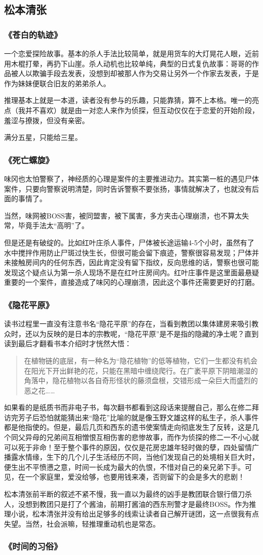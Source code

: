 \subsection{松本清张}
\subsubsection{《苍白的轨迹》}
一个恋爱探险故事。基本的杀人手法比较简单，就是用货车的大灯晃花人眼，近前用木棍打晕，再扔下山崖。杀人动机也比较单纯，典型的日式复仇故事：哥哥的作品被人以欺骗手段去发表，没想到却被那人作为交易让另外一个作家去发表，于是作为妹妹便联合旧友的弟弟杀人。
 
推理基本上就是一本道，读者没有参与的乐趣，只能靠猜，算不上本格。唯一的亮点（我并不喜欢）就是由一对恋人来作为侦探，但互动仅仅在于恋爱的开始阶段，羞涩与撩拨，但没有亲密。
 
满分五星，只能给三星。

\subsubsection{《死亡螺旋》}
味冈也太怕警察了，神经质的心理是案件的主要推进动力。其实第一桩的遇见尸体案件，只要向警察说明清楚，同时告诉警察不要张扬，事情就解决了，也就没有后面的事情了。 

当然，味网被BOSS害，被同盟害，被下属害，多方夹击心理崩溃，也不算太失常，毕竟手法太“高明”了。 

但是还是有破绽的。比如红叶庄杀人事件，尸体被长途运输4-5个小时，虽然有了水中搅拌作用防止尸斑过快生长，但很可能会留下痕迹，警察很容易发现；尸体并未接触房间内的任何东西，因此肯定没有留下指纹，反向思维的话，警察也很可能发现这个疑点认为第一杀人现场不是在红叶庄房间内。红叶庄事件是这里面最悬疑重要的一个案件，直接造成了味冈的心理崩溃，因此这个事件还需要更好的打磨。

\subsubsection{《隐花平原》}
读书过程里一直没有注意书名“隐花平原”的存在，当看到教团以集体建房来吸引教众时，还以为反映的是日本的宗教呢，“隐花平原”是不是指的隐藏的净土呢？直到读到最后才翻看书本介绍时才恍然大悟：
\begin{quotation}
在植物链的底层，有一种名为“隐花植物”的低等植物，它们一生都没有机会在阳光下开出鲜艳的花，只能在黑暗中缠绕爬行。在广袤平原下阴暗潮湿的角落中，隐花植物以各自奇形怪状的藤须盘根，交错形成一朵巨大而盛烈的恶之花……
\end{quotation}
如果看的是纸质书而非电子书，每次翻书都看到这段话来提醒自己，那么在修二拜访完芳子后恐怕就能猜出来“隐花”比喻的就是像玉野文雄这样的私生子，杀人事件都是他指使的。但是，最后几页和西东的遗书使案情走向彻底发生了反转，这是几个同父异母的兄弟间互相憎恨互相伤害的悲惨故事，而作为侦探的修二一不小心就可以死于非命！至于整个事件的原因，仅仅是花房忠雄年轻时做的孽，四处留情广播露水情缘，生下的几个儿子生活经历不同，当他们发现自己的处境相关巨大时，便生出不平愤懑之意，时间一长成为最大的仇恨，不惜对自己的亲兄弟下手。可见，在一个家庭里，爱没给够，也要用钱来凑，否则留下的会是多大的悲剧！

松本清张前半断的叙述不紧不慢，我一直以为最终的凶手是教团联合银行借刀杀人，没想到教团只是打了个酱油，前期打酱油的西东刑警才是最终BOSS。作为推理小说，松本清张并没有给出足够多的线索让读者自己解开谜团，这一点很我有点失望。当然，社会派嘛，轻推理重动机也是常态。

\subsubsection{《时间的习俗》}
